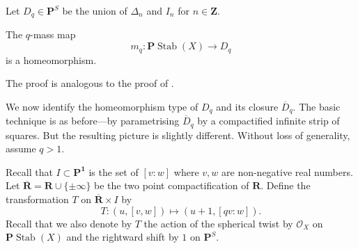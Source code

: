 \documentclass{amsart}
\begin{document}
Let \(D_q \in \mathbf{P}^S\) be the union of \(\Delta_n\) and \(I_n\) for \(n \in \mathbf{Z}\).
\begin{theorem}\label{thm:q-homeo}
  The \(q\)-mass map
  \[ m_q \colon \mathbf{P} \operatorname{Stab}(X) \to D_q\]
  is a homeomorphism.
\end{theorem}
The proof is analogous to the proof of .

We now identify the homeomorphism type of \(D_q\) and its closure \(\overline D_q\).
The basic technique is as before---by parametrising \(\overline D_q\) by a compactified infinite strip of squares.
But the resulting picture is slightly different.
Without loss of generality, assume \(q > 1\).

Recall that \(I  \subset \mathbf{P^1}\) is the set of \([v:w]\) where \(v, w\) are non-negative real numbers.
Let \(\overline {\mathbf{R}} = \mathbf{R} \cup \{\pm \infty\}\) be the two point compactification of \(\mathbf{R}\).
Define the transformation \(T\) on \(\overline{\mathbf{R}} \times I\) by
\[ T \colon (u,[v,w]) \mapsto (u+1,[qv:w]).\]
Recall that we also denote by \(T\) the action of the spherical twist by \(\mathcal{O}_X\) on \(\mathbf{P} \operatorname{Stab}(X)\) and the rightward shift by \(1\) on \(\mathbf{P}^S\).
\end{document}
